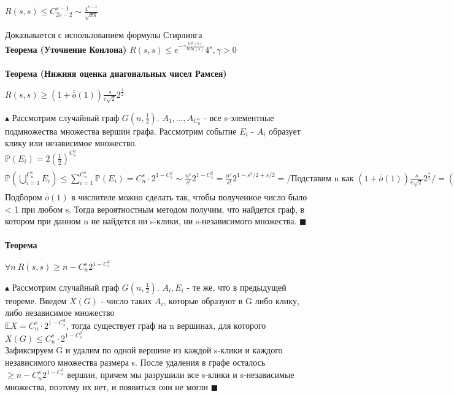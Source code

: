 \begin{center}
    $R(s,s) \leq C_{2s-2}^{s-1} \sim \frac{4^{s-1}}{\sqrt{\pi s}}$ 
\end{center}Доказывается с использованием формулы Стирлинга
\\
\textbf{Теорема (Уточнение Конлона)}
$R(s,s) \leq e^{-\gamma\frac{ln^2(s)}{lnln(s)}}4^s, \gamma > 0$
\\
\\
\textbf{Теорема (Нижняя оценка диагональных чисел Рамсея)}
\begin{center}
    $R(s,s) \geq (1 + \overline{\overline{o}}(1))\frac{s}{e\sqrt{2}}2^{\frac{s}{2}}$
\end{center}
$\blacktriangle$ Рассмотрим случайный граф $G(n, \frac{1}{2})$.  $A_1, ..., A_{C_{n}^s}$ - все s-элементные подмножества множества вершин графа. Рассмотрим событие $E_i$ - $A_i$ образует клику или независимое множество.
\\
$\mathbb{P}(E_i) = 2(\frac{1}{2})^{C_s^2}$
\\
$\mathbb{P}(\bigcup_{i=1}^{C_n^s}E_i) \leqslant \sum\limits_{i=1}^{C_n^s}\mathbb{P}(E_i) = C_n^s \cdot 2^{1-C_s^2} \sim \frac{n^s}{s!}2^{1-C_s^2} 
= \frac{n^s}{s!} 2^{1-s^2/2 + s/2 } 
=\Big / \text{Подставим n как } (1 + \overline{\overline{o}}(1)) \frac{s}{e \sqrt{2}} 2^{\frac{s}{2}} \Big / = (1+\overline{\overline{o}}(1))^s\frac{1}{e^s 2^{s/2}}\frac{s^s 2^{1+s/2}}{\sqrt{2\pi s}(\frac{s}{e})^s}\frac{1}{(1 + \overline{\overline{o}}(1))} = \frac{(1+\overline{\overline{o}}(1))^s}{(1 + \overline{\overline{o}}(1))}\frac{2}{\sqrt{2\pi s}}$
\\
Подбором $\overline{\overline{o}}(1)$ в числителе можно сделать так, чтобы полученное число было < 1 при любом s. Тогда вероятностным методом получим, что найдется граф, в котором при данном n не найдется ни s-клики, ни s-независимого множества. $\blacksquare$
\\
\\
\textbf{Теорема}
\begin{center}
    $\forall n \  R(s,s) \geqslant n - C_n^s 2^{1-C_s^2}$
\end{center}
$\blacktriangle$ Рассмотрим случайный граф $G(n, \frac{1}{2})$. $A_i, E_i$ - те же, что в предыдущей теореме. Введем $X(G)$ - число таких $A_i$, которые образуют в G либо клику, либо независимое множество
\\
$\mathbb{E} X =  C_n^s \cdot 2^{1-C_s^2}$, тогда существует граф на n вершинах, для которого $X(G) \leqslant C_n^s \cdot 2^{1-C_s^2} $
\\
Зафиксируем G  и удалим по одной вершине из каждой s-клики и каждого независимого множества размера s. После удаления в графе осталось $\geqslant n - C_n^s 2^{1-C_s^2}$ вершин, причем мы разрушили все s-клики и s-независимые множества, поэтому их нет, и появиться они не могли $\blacksquare$
